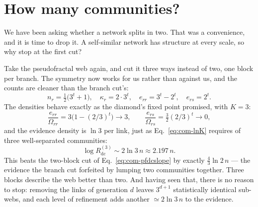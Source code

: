 \section{How many communities?}
\label{sec:com-howmany}

We have been asking whether a network splits in two. That was a convenience, and
it is time to drop it. A self-similar network has structure at every scale, so
why stop at the first cut?

Take the pseudofractal web again, and cut it three ways instead of two, one block
per branch. The symmetry now works for us rather than against us, and the counts
are cleaner than the branch cut's:
\begin{equation}
  n_r = \tfrac{1}{2}\big(3^{t}+1\big), \quad
  \kappa_r = 2\cdot 3^{t}, \quad
  e_{rr} = 3^{t}-2^{t}, \quad
  e_{rs} = 2^{t}.
  \label{eq:com-three}
\end{equation}
The densities behave exactly as the diamond's fixed point promised, with $K=3$:
\begin{equation}
  \frac{e_{rr}}{\Omega_{rr}} = 3\big(1-(2/3)^{t}\big)\to 3,
  \qquad
  \frac{e_{rs}}{\Omega_{rs}} = \tfrac{3}{2}(2/3)^{t}\to 0,
  \label{eq:com-threeratios}
\end{equation}
and the evidence density is $\ln 3$ per link, just as Eq.~\eqref{eq:com-lnK}
requires of three well-separated communities:
\begin{equation}
  \log R_{\mathrm{dc}}^{(3)} \sim 2\ln 3\,n \approx 2.197\,n .
  \label{eq:com-slope3}
\end{equation}
This beats the two-block cut of Eq.~\eqref{eq:com-pfdcslope} by exactly
$\tfrac{4}{3}\ln 2\,n$ --- the evidence the branch cut forfeited by lumping two
communities together. Three blocks describe the web better than two. And having
seen that, there is no reason to stop: removing the links of generation $d$ leaves
$3^{d+1}$ statistically identical sub-webs, and each level of refinement adds
another $\simeq2\ln3\,n$ to the evidence.

